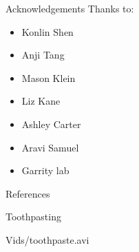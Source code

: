 \documentclass{beamer}%
\begin{document}
%
%
%

\begin{frame}{Acknowledgements}
%
 Thanks to:
 \begin{itemize}
   \item Konlin Shen
   \item Anji Tang
   \item Mason Klein
   \item Liz Kane
   \item Ashley Carter
   \item Aravi Samuel
   \item Garrity lab
 \end{itemize}
%
\end{frame}


\begin{frame}[allowframebreaks]{References}
%

 {\small
 
 
 }
%
\end{frame}


\begin{frame}[label=fr_toothpaste]{Toothpasting}
%
 \begin{center}
   {Vids/toothpaste.avi}
 \end{center}
 \hyperlink{fr_loco}{}
%
\end{frame}

\end{document}
